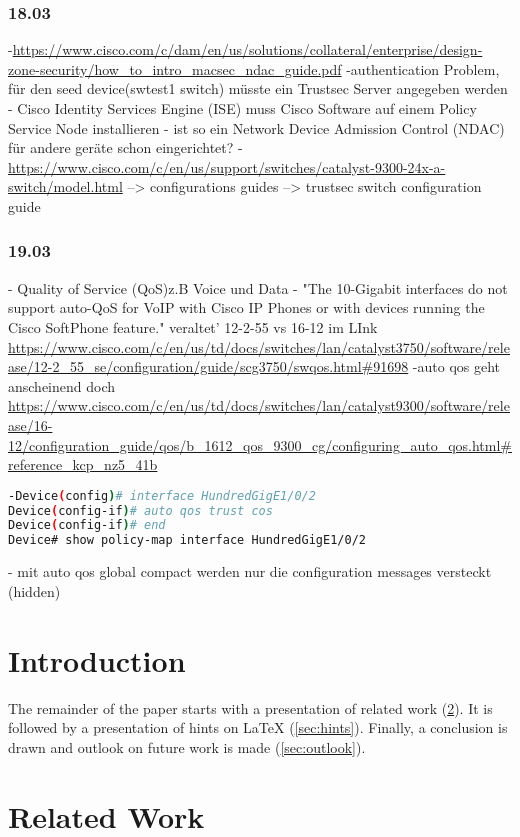 \documentclass[english,runningheads,a4paper]{llncs}[2018/03/10]
\newcommand{\commentatside}[1]{\pdfcomment[color={0.045 0.278 0.643},icon=Note]{#1}}
\newcommand{\todo}[1]{\commentatside{#1}}
\begin{document}
\subsubsection{18.03}
-\url{https://www.cisco.com/c/dam/en/us/solutions/collateral/enterprise/design-zone-security/how_to_intro_macsec_ndac_guide.pdf}
-authentication Problem, für den seed device(swtest1 switch) müsste ein Trustsec Server angegeben werden
- Cisco Identity Services Engine (ISE) muss Cisco Software auf einem Policy Service Node installieren
- ist so ein Network Device Admission Control (NDAC) für andere geräte schon eingerichtet?
-\url{https://www.cisco.com/c/en/us/support/switches/catalyst-9300-24x-a-switch/model.html} --> configurations guides --> trustsec switch configuration guide

\subsubsection{19.03}
- Quality of Service (QoS)z.B Voice und Data
- "The 10-Gigabit interfaces do not support auto-QoS for VoIP with Cisco IP Phones or with devices running the Cisco SoftPhone feature." veraltet' 12-2-55 vs 16-12 im LInk
\url{https://www.cisco.com/c/en/us/td/docs/switches/lan/catalyst3750/software/release/12-2_55_se/configuration/guide/scg3750/swqos.html#91698}
-auto qos geht anscheinend doch
\url{https://www.cisco.com/c/en/us/td/docs/switches/lan/catalyst9300/software/release/16-12/configuration_guide/qos/b_1612_qos_9300_cg/configuring_auto_qos.html#reference_kcp_nz5_41b}
\begin{lstlisting}[language=bash]
-Device(config)# interface HundredGigE1/0/2
Device(config-if)# auto qos trust cos
Device(config-if)# end
Device# show policy-map interface HundredGigE1/0/2
\end{lstlisting}
- mit auto qos global compact werden nur die configuration  messages versteckt (hidden)


\section{Introduction}\label{sec:intro}
\lipsum[1-3]\todo{Refine me}

The remainder of the paper starts with a presentation of related work (\cref{sec:relatedwork}).
It is followed by a presentation of hints on \LaTeX{} (\cref{sec:hints}).
Finally, a conclusion is drawn and outlook on future work is made (\cref{sec:outlook}).

\section{Related Work}
\label{sec:relatedwork}
\end{document}
